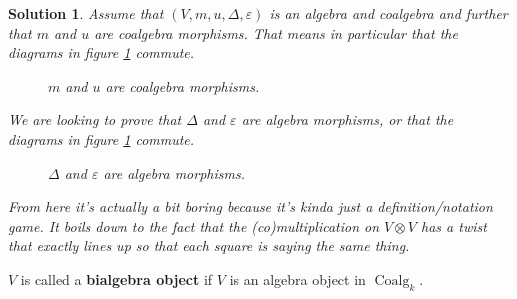 \documentclass[12pt]{article}
\theoremstyle{break}
\theoremstyle{nonumberbreak}
\newtheorem{sol}{Solution}
\theoremstyle{changebreak}
\theoremstyle{break}
\theoremstyle{nonumberbreak}
\theoremstyle{nonumberplain}
\theoremstyle{change}
\newcommand*{\Coalgk}{\operatorname{Coalg}_k}
\begin{document}
\begin{sol}
	Assume that $(V,m,u,\Delta,\varepsilon)$ is an algebra and coalgebra and further that
	$m$ and $u$ are coalgebra morphisms. That means in particular that the diagrams in figure \ref{fig-coalg-mor} commute.
	\begin{figure}[h]\label{fig-coalg-mor}
		\centering
		\label{fig-coalg-mor}
		\caption{$m$ and $u$ are coalgebra morphisms.}
	\end{figure}

	We are looking to prove that $\Delta$ and $\varepsilon$ are algebra morphisms, or that 
	the diagrams in figure \ref{fig-coalg-mor}  commute.
	\begin{figure}[h]
		\centering
		\label{fig-alg-mor}
		\caption{$\Delta$ and $\varepsilon$ are algebra morphisms.}
	\end{figure}

	From here it's actually a bit boring because it's kinda just a definition/notation game.
	It boils down to the fact that the (co)multiplication on $V\otimes V$ has a twist that 
	exactly lines up so that each square is saying the same thing.
\end{sol}

\begin{defn}
	$V$ is called a \textbf{bialgebra object} if $V$ is an algebra object in $\Coalgk$.
\end{defn}
\end{document}
